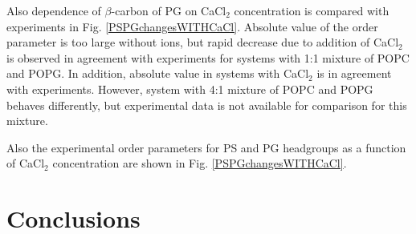 \documentclass[aps,prl,superscriptaddress,twocolumn]{revtex4}
\begin{document}
Also dependence of $\beta$-carbon of PG on CaCl$_2$ concentration is compared with
experiments \cite{borle85} in Fig. \ref{PSPGchangesWITHCaCl}. Absolute value of
the order parameter is too large without ions, but rapid decrease due to addition of
CaCl$_2$ is observed in agreement with experiments for systems with 1:1 mixture of POPC and POPG.
In addition, absolute value in systems with CaCl$_2$ is in agreement with experiments.
However, system with 4:1 mixture of POPC and POPG behaves differently, but experimental
data is not available for comparison for this mixture.



Also the experimental order parameters for PS and PG headgroups
as a function of CaCl$_2$ concentration are shown in Fig. \ref{PSPGchangesWITHCaCl}.





\section{Conclusions}


%
\end{document}
